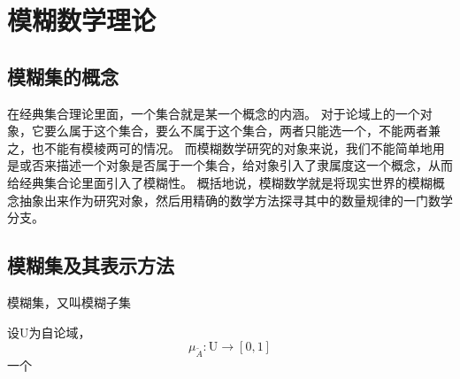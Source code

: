 \chapter[模糊数学理论]{模糊数学理论}
\section{模糊集的概念}
\par
在经典集合理论里面，一个集合就是某一个概念的内涵。
对于论域上的一个对象，它要么属于这个集合，要么不属于这个集合，两者只能选一个，不能两者兼之，也不能有模棱两可的情况。
而模糊数学研究的对象来说，我们不能简单地用是或否来描述一个对象是否属于一个集合，给对象引入了隶属度这一个概念，从而给经典集合论里面引入了模糊性。
概括地说，模糊数学就是将现实世界的模糊概念抽象出来作为研究对象，然后用精确的数学方法探寻其中的数量规律的一门数学分支。

\section{模糊集及其表示方法}
模糊集，又叫模糊子集
\begin{definition}
    设$\mathrm{U}$为自论域，
    \[
        \mu_{\tilde{A}}: \mathrm{U} \longrightarrow[0,1]
    \]
    一个
\end{definition}